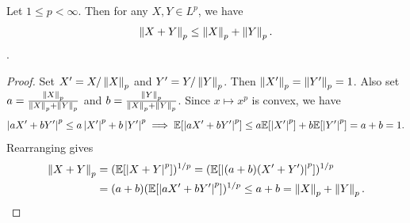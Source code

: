 \begin{lemma}
    Let $1 \leq p < \infty$. Then for any $X,Y \in L^{p}$, we have
    \begin{align}
        \left\lVert X+Y\right\rVert_{p} \leq \left\lVert X\right\rVert_{p} + \left\lVert Y\right\rVert_{p}.
    \end{align}.
\end{lemma}
\begin{proof}
    Set $X' = X/\left\lVert X\right\rVert_{p}$ and $Y' = Y/\left\lVert Y\right\rVert_{p}$. Then $\left\lVert X'\right\rVert_{p} = \left\lVert Y'\right\rVert_{p} = 1$. Also set $a = \frac{\left\lVert X\right\rVert_{p}}{\left\lVert X\right\rVert_{p}+\left\lVert Y\right\rVert_{p}}$ and $b = \frac{\left\lVert Y\right\rVert_{p}}{\left\lVert X\right\rVert_{p}+\left\lVert Y\right\rVert_{p}}$. Since $x \mapsto x^{p}$ is convex, we have
    \begin{align}
        \left| aX'+bY' \right|^{p} \leq a\left| X' \right|^{p} + b\left| Y' \right|^{p} \implies \mathbb{E}[\left| aX'+bY' \right|^{p}] \leq a\mathbb{E}[\left| X' \right|^{p}] + b\mathbb{E}[\left| Y' \right|^{p}] = a+b = 1.
    \end{align}
    Rearranging gives
    \begin{align}
        \left\lVert X+Y\right\rVert_{p} &= (\mathbb{E}[\left| X+Y \right|^{p}])^{1/p} = (\mathbb{E}[\left| (a+b)(X'+Y') \right|^{p}])^{1/p} \notag \\ &= (a+b)(\mathbb{E}[\left| aX'+bY' \right|^{p}])^{1/p} \leq a+b = \left\lVert X\right\rVert_{p} + \left\lVert Y\right\rVert_{p}.
    \end{align}
\end{proof}

